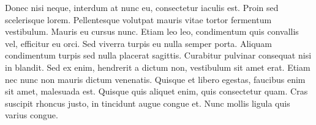 \documentclass[12pt]{article}
\begin{document}
Donec nisi neque, interdum at nunc eu, consectetur iaculis est. Proin sed scelerisque lorem. Pellentesque volutpat mauris vitae tortor fermentum vestibulum. Mauris eu cursus nunc. Etiam leo leo, condimentum quis convallis vel, efficitur eu orci. Sed viverra turpis eu nulla semper porta. Aliquam condimentum turpis sed nulla placerat sagittis. Curabitur pulvinar consequat nisi in blandit. Sed ex enim, hendrerit a dictum non, vestibulum sit amet erat. Etiam nec nunc non mauris dictum venenatis. Quisque et libero egestas, faucibus enim sit amet, malesuada est. Quisque quis aliquet enim, quis consectetur quam. Cras suscipit rhoncus justo, in tincidunt augue congue et. Nunc mollis ligula quis varius congue.

\nocite{Martin2018}
\newpage
{}



	
\end{document}
